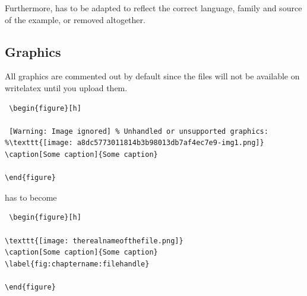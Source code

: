 Furthermore,  has to be adapted to reflect the correct language, family and source of the example, or removed altogether. 

\subsection{Graphics}
All graphics are commented out by default since the files will not be available on writelatex until you upload them. 

\begin{verbatim}
 \begin{figure}[h]

 [Warning: Image ignored] % Unhandled or unsupported graphics:
%\texttt{[image: a8dc5773011814b3b98013db7af4ec7e9-img1.png]}
\caption[Some caption]{Some caption}

\end{figure}
\end{verbatim}

has to become


\begin{verbatim}
 \begin{figure}[h]
 
\texttt{[image: therealnameofthefile.png]}
\caption[Some caption]{Some caption}
\label{fig:chaptername:filehandle}

\end{figure}
\end{verbatim}
